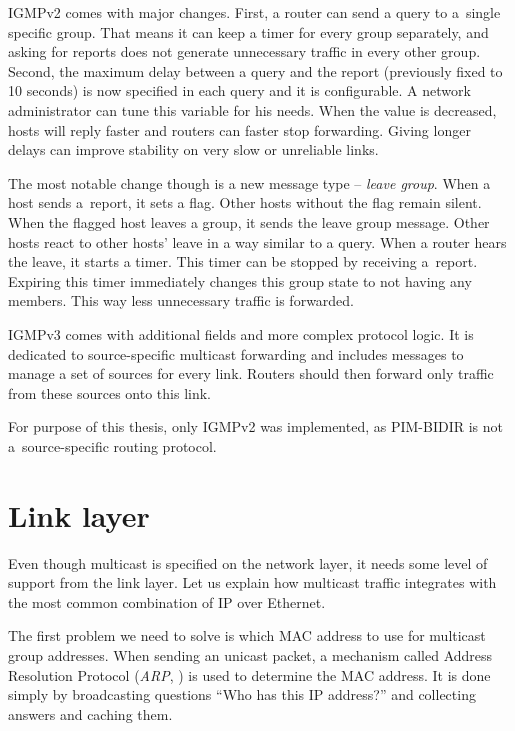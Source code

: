 IGMPv2 \cite{rfc2236} comes with major changes. First, a router can send
a query to a~single specific group. That means it can keep a timer for every group
separately, and asking for reports does not generate unnecessary traffic in
every other group. Second, the maximum delay between a query and the report
(previously fixed to 10 seconds) is now specified in each query and it is
configurable. A network administrator can tune this variable for his needs.
When the value is decreased, hosts will reply faster and routers can faster stop
forwarding. Giving longer delays can improve stability on very slow or
unreliable links.

The most notable change though is a new message type -- \emph{leave group}. When a host
sends a~report, it sets a flag. Other hosts without the flag remain silent. When
the flagged host leaves a group, it sends the leave group message. Other hosts
react to other hosts' leave in a way similar to a query. When a router hears the leave,
it starts a timer. This timer can be stopped by receiving a~report. Expiring this
timer immediately changes this group state to not having any members. This way
less unnecessary traffic is forwarded.

IGMPv3 comes with additional fields and more complex protocol logic. It is
dedicated to source-specific multicast forwarding and includes messages to manage
a set of sources for every link. Routers should then forward only traffic from
these sources onto this link.

For purpose of this thesis, only IGMPv2 was implemented, as PIM-BIDIR is not
a~source-specific routing protocol.

\section{Link layer}

Even though multicast is specified on the network layer, it needs some level of
support from the link layer. Let us explain how multicast traffic integrates with
the most common combination of IP over Ethernet.

The first problem we need to solve is which MAC address to use for multicast
group addresses. When sending an unicast packet, a mechanism called Address
Resolution Protocol (\emph{ARP}, ) is used to determine the MAC
address. It is done simply by broadcasting questions ``Who has this IP
address?'' and collecting answers and caching them.


